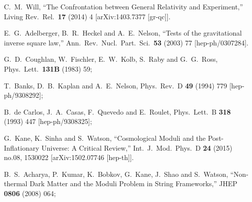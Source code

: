 \documentclass[11pt,a4paper]{article}
\begin{document}
\begin{thebibliography}{99}

  C.~M.~Will,
  ``The Confrontation between General Relativity and Experiment,''
  Living Rev.\ Rel.\  {\bf 17} (2014) 4
  [arXiv:1403.7377 [gr-qc]].


  E.~G.~Adelberger, B.~R.~Heckel and A.~E.~Nelson,
  ``Tests of the gravitational inverse square law,''
  Ann.\ Rev.\ Nucl.\ Part.\ Sci.\  {\bf 53} (2003) 77
  [hep-ph/0307284].


  G.~D.~Coughlan, W.~Fischler, E.~W.~Kolb, S.~Raby and G.~G.~Ross,
  Phys.\ Lett.\  {\bf 131B} (1983) 59;

  T.~Banks, D.~B.~Kaplan and A.~E.~Nelson,
  Phys.\ Rev.\ D {\bf 49} (1994) 779
  [hep-ph/9308292];
  
  
  B.~de Carlos, J.~A.~Casas, F.~Quevedo and E.~Roulet,
  Phys.\ Lett.\ B {\bf 318} (1993) 447
  [hep-ph/9308325];
  
  G.~Kane, K.~Sinha and S.~Watson,
  ``Cosmological Moduli and the Post-Inflationary Universe: A Critical Review,''
  Int.\ J.\ Mod.\ Phys.\ D {\bf 24} (2015) no.08,  1530022
  [arXiv:1502.07746 [hep-th]].
  

  B.~S.~Acharya, P.~Kumar, K.~Bobkov, G.~Kane, J.~Shao and S.~Watson,
  ``Non-thermal Dark Matter and the Moduli Problem in String Frameworks,''
  JHEP {\bf 0806} (2008) 064;
  

\end{thebibliography}
\end{document}
